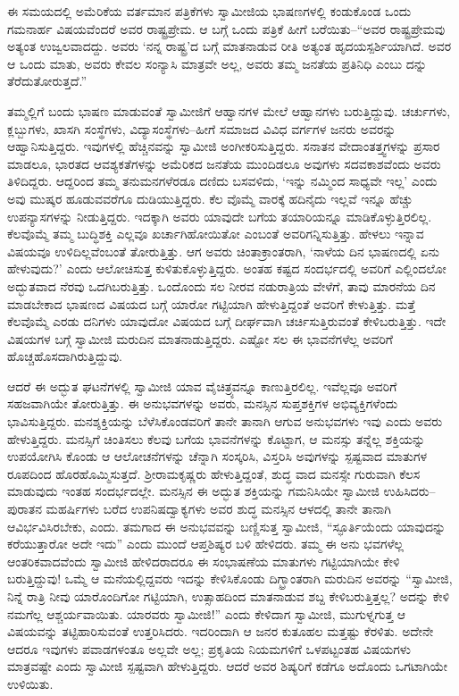 ಈ ಸಮಯದಲ್ಲಿ ಅಮೆರಿಕೆಯ ವರ್ತಮಾನ ಪತ್ರಿಕೆಗಳು ಸ್ವಾಮೀಜಿಯ ಭಾಷಣಗಳಲ್ಲಿ ಕಂಡುಕೊಂಡ ಒಂದು ಗಮನಾರ್ಹ ವಿಷಯವೆಂದರೆ ಅವರ ರಾಷ್ಟ್ರಪ್ರೇಮ. ಆ ಬಗ್ಗೆ ಒಂದು ಪತ್ರಿಕೆ ಹೀಗೆ ಬರೆಯಿತು–“ಅವರ ರಾಷ್ಟ್ರಪ್ರೇಮವು ಅತ್ಯಂತ ಉಜ್ವಲವಾದದ್ದು. ಅವರು ‘ನನ್ನ ರಾಷ್ಟ್ರ’ದ ಬಗ್ಗೆ ಮಾತನಾಡುವ ರೀತಿ ಅತ್ಯಂತ ಹೃದಯಸ್ಪರ್ಶಿಯಾಗಿದೆ. ಅವರ ಆ ಒಂದು ಮಾತು, ಅವರು ಕೇವಲ ಸಂನ್ಯಾಸಿ ಮಾತ್ರವೇ ಅಲ್ಲ, ಅವರು ತಮ್ಮ ಜನತೆಯ ಪ್ರತಿನಿಧಿ ಎಂಬು ದನ್ನು ತೆರೆದುತೋರುತ್ತದೆ.”

ತಮ್ಮಲ್ಲಿಗೆ ಬಂದು ಭಾಷಣ ಮಾಡುವಂತೆ ಸ್ವಾಮೀಜಿಗೆ ಆಹ್ವಾನಗಳ ಮೇಲೆ ಆಹ್ವಾನಗಳು ಬರುತ್ತಿದ್ದುವು. ಚರ್ಚುಗಳು, ಕ್ಲಬ್ಬುಗಳು, ಖಾಸಗಿ ಸಂಸ್ಥೆಗಳು, ವಿದ್ಯಾಸಂಸ್ಥೆಗಳು–ಹೀಗೆ ಸಮಾಜದ ವಿವಿಧ ವರ್ಗಗಳ ಜನರು ಅವರನ್ನು ಆಹ್ವಾನಿಸುತ್ತಿದ್ದರು. ಇವುಗಳಲ್ಲಿ ಹೆಚ್ಚಿನವನ್ನು ಸ್ವಾಮೀಜಿ ಅಂಗೀಕರಿಸುತ್ತಿದ್ದರು. ಸನಾತನ ವೇದಾಂತತ್ತ್ವಗಳನ್ನು ಪ್ರಸಾರ ಮಾಡಲೂ, ಭಾರತದ ಆವಶ್ಯಕತೆಗಳನ್ನು ಅಮೆರಿಕದ ಜನತೆಯ ಮುಂದಿಡಲೂ ಅವುಗಳು ಸದವಕಾಶವೆಂದು ಅವರು ತಿಳಿದಿದ್ದರು. ಆದ್ದರಿಂದ ತಮ್ಮ ತನುಮನಗಳೆರಡೂ ದಣಿದು ಬಸವಳಿದು, ‘ಇನ್ನು ನಮ್ಮಿಂದ ಸಾಧ್ಯವೇ ಇಲ್ಲ’ ಎಂದು ಅವು ಮುಷ್ಕರ ಹೂಡುವವರೆಗೂ ದುಡಿಯುತ್ತಿದ್ದರು. ಕೆಲ ವೊಮ್ಮೆ ವಾರಕ್ಕೆ ಹದಿನೈದು ಇಲ್ಲವೆ ಇನ್ನೂ ಹೆಚ್ಚು ಉಪನ್ಯಾಸಗಳನ್ನು ನೀಡುತ್ತಿದ್ದರು. ಇದಕ್ಕಾಗಿ ಅವರು ಯಾವುದೇ ಬಗೆಯ ತಯಾರಿಯನ್ನೂ ಮಾಡಿಕೊಳ್ಳುತ್ತಿರಲಿಲ್ಲ. ಕೆಲವೊಮ್ಮೆ ತಮ್ಮ ಬುದ್ಧಿಶಕ್ತಿ ಎಲ್ಲವೂ ಖರ್ಚಾಗಿಹೋಯಿತೋ ಎಂಬಂತೆ ಅವರಿಗನ್ನಿಸುತ್ತಿತ್ತು. ಹೇಳಲು ಇನ್ನಾವ ವಿಷಯವೂ ಉಳಿದಿಲ್ಲವೆಂಬಂತೆ ತೋರುತ್ತಿತ್ತು. ಆಗ ಅವರು ಚಿಂತಾಕ್ರಾಂತರಾಗಿ, ‘ನಾಳೆಯ ದಿನ ಭಾಷಣದಲ್ಲಿ ಏನು ಹೇಳುವುದು?’ ಎಂದು ಆಲೋಚಿಸುತ್ತ ಕುಳಿತುಕೊಳ್ಳುತ್ತಿದ್ದರು. ಅಂತಹ ಕಷ್ಟದ ಸಂದರ್ಭದಲ್ಲಿ ಅವರಿಗೆ ಎಲ್ಲಿಂದಲೋ ಅದ್ಭುತವಾದ ನೆರವು ಒದಗಿಬರುತ್ತಿತ್ತು. ಒಂದೊಂದು ಸಲ ನೀರವ ನಡುರಾತ್ರಿಯ ವೇಳೆಗೆ, ತಾವು ಮಾರನೆಯ ದಿನ ಮಾಡಬೇಕಾದ ಭಾಷಣದ ವಿಷಯದ ಬಗ್ಗೆ ಯಾರೋ ಗಟ್ಟಿಯಾಗಿ ಹೇಳುತ್ತಿದ್ದಂತೆ ಅವರಿಗೆ ಕೇಳುತ್ತಿತ್ತು. ಮತ್ತೆ ಕೆಲವೊಮ್ಮೆ ಎರಡು ದನಿಗಳು ಯಾವುದೋ ವಿಷಯದ ಬಗ್ಗೆ ದೀರ್ಘವಾಗಿ ಚರ್ಚಿಸುತ್ತಿರುವಂತೆ ಕೇಳಿಬರುತ್ತಿತ್ತು. ಇದೇ ವಿಷಯಗಳ ಬಗ್ಗೆ ಸ್ವಾಮೀಜಿ ಮರುದಿನ ಮಾತನಾಡುತ್ತಿದ್ದರು. ಎಷ್ಟೋ ಸಲ ಈ ಭಾವನೆಗಳೆಲ್ಲ ಅವರಿಗೆ ಹೊಚ್ಚಹೊಸದಾಗಿರುತ್ತಿದ್ದುವು.

ಆದರೆ ಈ ಅದ್ಭುತ ಘಟನೆಗಳಲ್ಲಿ ಸ್ವಾಮೀಜಿ ಯಾವ ವೈಚಿತ್ರ್ಯವನ್ನೂ ಕಾಣುತ್ತಿರಲಿಲ್ಲ. ಇವೆಲ್ಲವೂ ಅವರಿಗೆ ಸಹಜವಾಗಿಯೇ ತೋರುತ್ತಿತ್ತು. ಈ ಅನುಭವಗಳನ್ನು ಅವರು, ಮನಸ್ಸಿನ ಸುಪ್ತಶಕ್ತಿಗಳ ಅಭಿವ್ಯಕ್ತಿಗಳೆಂದು ಭಾವಿಸುತ್ತಿದ್ದರು. ಮನಶ್ಶಕ್ತಿಯನ್ನು ಬೆಳೆಸಿಕೊಂಡವರಿಗೆ ತಾನೇ ತಾನಾಗಿ ಆಗುವ ಅನುಭವಗಳು ಇವು ಎಂದು ಅವರು ಹೇಳುತ್ತಿದ್ದರು. ಮನಸ್ಸಿಗೆ ಚಿಂತಿಸಲು ಕೆಲವು ಬಗೆಯ ಭಾವನೆಗಳನ್ನು ಕೊಟ್ಟಾಗ, ಆ ಮನಸ್ಸು ತನ್ನೆಲ್ಲ ಶಕ್ತಿಯನ್ನು ಉಪಯೋಗಿಸಿ ಕೊಂಡು ಆ ಆಲೋಚನೆಗಳನ್ನು ಚೆನ್ನಾಗಿ ಸಂಸ್ಕರಿಸಿ, ವಿಸ್ತರಿಸಿ ಅವುಗಳನ್ನು ಸ್ಪಷ್ಟವಾದ ಮಾತುಗಳ ರೂಪದಿಂದ ಹೊರಹೊಮ್ಮಿಸುತ್ತದೆ. ಶ್ರೀರಾಮಕೃಷ್ಣರು ಹೇಳುತ್ತಿದ್ದಂತೆ, ಶುದ್ಧ ವಾದ ಮನಸ್ಸೇ ಗುರುವಾಗಿ ಕೆಲಸ ಮಾಡುವುದು ಇಂತಹ ಸಂದರ್ಭದಲ್ಲೇ. ಮನಸ್ಸಿನ ಈ ಅದ್ಭುತ ಶಕ್ತಿಯನ್ನು ಗಮನಿಸಿಯೇ ಸ್ವಾಮೀಜಿ ಉಹಿಸಿದರು–ಪುರಾತನ ಮಹರ್ಷಿಗಳು ಬರೆದ ಉಪನಿಷದ್ವಾಕ್ಯಗಳು ಅವರ ಶುದ್ಧ ಮನಸ್ಸಿನ ಆಳದಲ್ಲಿ ತಾನೇ ತಾನಾಗಿ ಆವಿರ್ಭವಿಸಿರಬೇಕು, ಎಂದು. ತಮಗಾದ ಈ ಅನುಭವವನ್ನು ಬಣ್ಣಿಸುತ್ತ ಸ್ವಾಮೀಜಿ, “ಸ್ಫೂರ್ತಿಯೆಂದು ಯಾವುದನ್ನು ಕರೆಯುತ್ತಾರೋ ಅದೇ ಇದು” ಎಂದು ಮುಂದೆ ಆಪ್ತಶಿಷ್ಯರ ಬಳಿ ಹೇಳಿದರು. ತಮ್ಮ ಈ ಅನು ಭವಗಳೆಲ್ಲ ಆಂತರಿಕವಾದವೆಂದು ಸ್ವಾಮೀಜಿ ಹೇಳಿದರಾದರೂ ಈ ಸಂಭಾಷಣೆಯ ಮಾತುಗಳು ಗಟ್ಟಿಯಾಗಿಯೇ ಕೇಳಿ ಬರುತ್ತಿದ್ದುವು! ಒಮ್ಮೆ ಆ ಮನೆಯಲ್ಲಿದ್ದವರು ಇದನ್ನು ಕೇಳಿಸಿಕೊಂಡು ದಿಗ್ಭ್ರಾಂತರಾಗಿ ಮರುದಿನ ಅವರನ್ನು “ಸ್ವಾಮೀಜಿ, ನಿನ್ನೆ ರಾತ್ರಿ ನೀವು ಯಾರೊಂದಿಗೋ ಗಟ್ಟಿಯಾಗಿ, ಉತ್ಸಾಹದಿಂದ ಮಾತನಾಡುವ ಶಬ್ದ ಕೇಳಿಬರುತ್ತಿತ್ತಲ್ಲ? ಅದನ್ನು ಕೇಳಿ ನಮಗೆಲ್ಲ ಆಶ್ಚರ್ಯವಾಯಿತು. ಯಾರವರು ಸ್ವಾಮೀಜಿ!” ಎಂದು ಕೇಳಿದಾಗ ಸ್ವಾಮೀಜಿ, ಮುಗುಳ್ನಗುತ್ತ ಆ ವಿಷಯವನ್ನು ತಟ್ಟಿಹಾರಿಸುವಂತೆ ಉತ್ತರಿಸಿದರು. ಇದರಿಂದಾಗಿ ಆ ಜನರ ಕುತೂಹಲ ಮತ್ತಷ್ಟು ಕೆರಳಿತು. ಅದೇನೇ ಆದರೂ ಇವುಗಳು ಪವಾಡಗಳಂತೂ ಅಲ್ಲವೇ ಅಲ್ಲ; ಪ್ರಕೃತಿಯ ನಿಯಮಗಳಿಗೆ ಒಳಪಟ್ಟಂತಹ ವಿಷಯಗಳು ಮಾತ್ರವಷ್ಟೇ ಎಂದು ಸ್ವಾಮೀಜಿ ಸ್ಪಷ್ಟವಾಗಿ ಹೇಳುತ್ತಿದ್ದರು. ಆದರೆ ಅವರ ಶಿಷ್ಯರಿಗೆ ಕಡೆಗೂ ಅದೊಂದು ಒಗಟಾಗಿಯೇ ಉಳಿಯಿತು.

